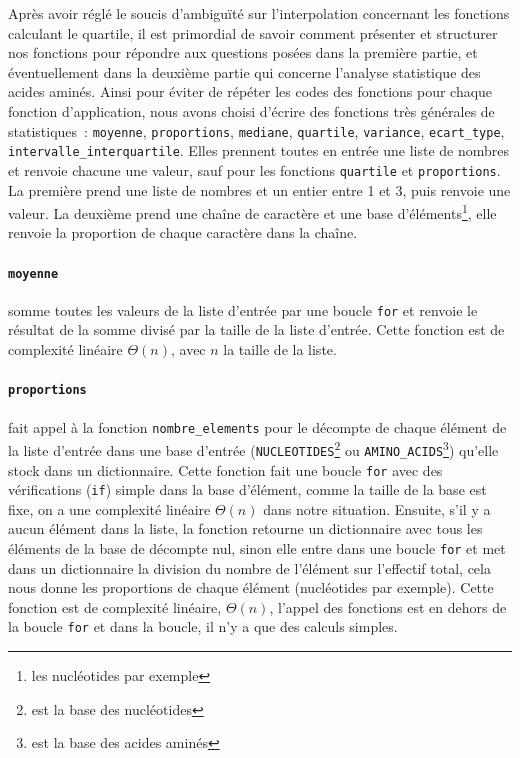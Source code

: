 \documentclass[12pt]{article}
\begin{document}
Après avoir réglé le soucis d'ambiguïté sur l'interpolation concernant les fonctions calculant le quartile, il est primordial de savoir comment présenter et structurer nos fonctions pour répondre aux questions posées dans la première partie, et éventuellement dans la deuxième partie qui concerne l'analyse statistique des acides aminés. Ainsi pour éviter de répéter les codes des fonctions pour chaque fonction d'application, nous avons choisi d'écrire des fonctions très générales de statistiques~: \texttt{moyenne}, \texttt{proportions}, \texttt{mediane}, \texttt{quartile}, \texttt{variance}, \texttt{ecart\_type}, \texttt{intervalle\_interquartile}. Elles prennent toutes en entrée une liste de nombres et renvoie chacune une valeur, sauf pour les fonctions \texttt{quartile} et \texttt{proportions}. La première prend une liste de nombres et un entier entre 1 et 3, puis renvoie une valeur. La deuxième prend une chaîne de caractère et une base d'éléments\footnote{les nucléotides par exemple}, elle renvoie la proportion de chaque caractère dans la chaîne.
\paragraph{\texttt{moyenne}} somme toutes les valeurs de la liste d'entrée par une boucle \texttt{for} et renvoie le résultat de la somme divisé par la taille de la liste d'entrée. Cette fonction est de complexité linéaire $\Theta(n)$, avec $n$ la taille de la liste.
\paragraph{\texttt{proportions}} fait appel à la fonction \texttt{nombre\_elements} pour le décompte de chaque élément de la liste d'entrée dans une base d'entrée (\texttt{NUCLEOTIDES}\footnote{est la base des nucléotides} ou \texttt{AMINO\_ACIDS}\footnote{est la base des acides aminés}) qu'elle stock dans un dictionnaire. Cette fonction fait une boucle \texttt{for} avec des vérifications (\texttt{if}) simple dans la base d'élément, comme la taille de la base est fixe, on a une complexité linéaire $\Theta(n)$ dans notre situation. Ensuite, s'il y a aucun élément dans la liste, la fonction retourne un dictionnaire avec tous les éléments de la base de décompte nul, sinon elle entre dans une boucle \texttt{for} et met dans un dictionnaire la division du nombre de l'élément sur l'effectif total, cela nous donne les proportions de chaque élément (nucléotides par exemple). Cette fonction est de complexité linéaire, $\Theta(n)$, l'appel des fonctions est en dehors de la boucle \texttt{for} et dans la boucle, il n'y a que des calculs simples.
\end{document}
